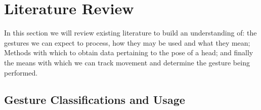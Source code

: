 \section{Literature Review} %

In this section we will review existing literature to build an understanding of: the gestures we can expect to process, how they may be used and what they mean; Methods with which to obtain data pertaining to the pose of a head; and finally the means with which we can track movement and determine the gesture being performed.




\subsection{Gesture Classifications and Usage} %

